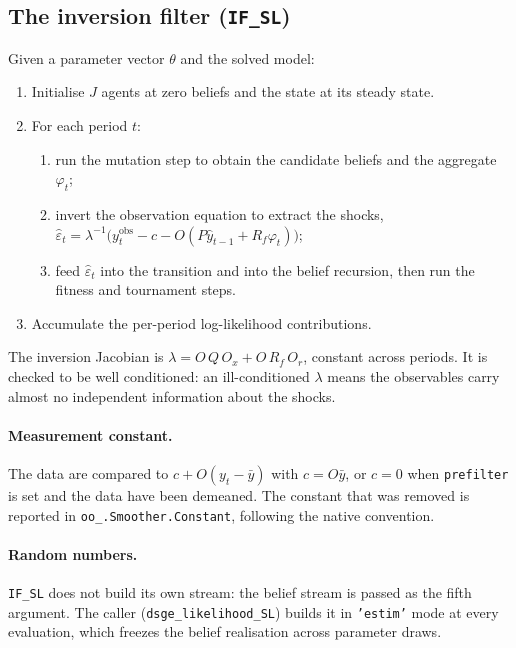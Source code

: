 \documentclass[11pt,a4paper]{article}
\newcommand{\option}[1]{\texttt{#1}}
\newcommand{\field}[1]{\texttt{#1}}
\begin{document}
\subsection{The inversion filter (\texttt{IF\_SL})}
\label{sec:estimation:filter}

Given a parameter vector $\theta$ and the solved model:

\begin{enumerate}[leftmargin=2em]
\item Initialise $J$ agents at zero beliefs and the state at its steady state.
\item For each period $t$:
      \begin{enumerate}
      \item run the mutation step to obtain the candidate beliefs and the
            aggregate $\varphi_t$;
      \item invert the observation equation to extract the shocks,
            $\hat{\varepsilon}_t = \lambda^{-1}\bigl(y_t^{\text{obs}} - c
            - O(P\hat{y}_{t-1} + R_f\varphi_t)\bigr)$;
      \item feed $\hat{\varepsilon}_t$ into the transition and into the belief
            recursion, then run the fitness and tournament steps.
      \end{enumerate}
\item Accumulate the per-period log-likelihood contributions.
\end{enumerate}

The inversion Jacobian is
$\lambda = O\,Q\,O_x + O\,R_f\,O_r$, constant across periods. It is checked to
be well conditioned: an ill-conditioned $\lambda$ means the observables carry
almost no independent information about the shocks.

\paragraph{Measurement constant.} The data are compared to
$c + O(y_t - \bar{y})$ with $c = O\bar{y}$, or $c = 0$ when
\option{prefilter} is set and the data have been demeaned. The constant that
was removed is reported in \field{oo\_.Smoother.Constant}, following the native
convention.

\paragraph{Random numbers.} \texttt{IF\_SL} does not build its own stream: the
belief stream is passed as the fifth argument. The caller
(\texttt{dsge\_likelihood\_SL}) builds it in \texttt{'estim'} mode at every
evaluation, which freezes the belief realisation across parameter draws.
\end{document}
